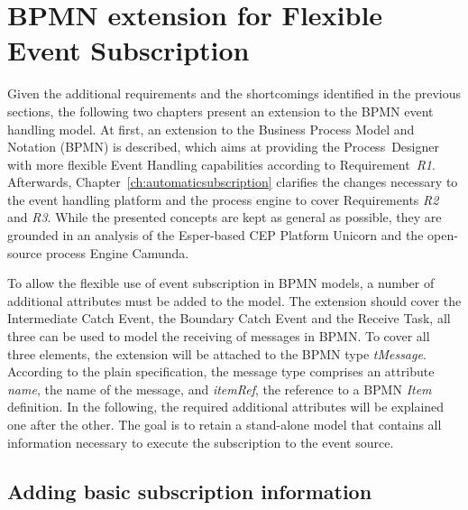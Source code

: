 \chapter{BPMN extension for Flexible Event Subscription}\label{ch:flexibleeventsubscription}


Given the additional requirements and the shortcomings identified in the previous sections, the following two chapters present an extension to the BPMN event handling model.
At first, an extension to the Business Process Model and Notation (BPMN) is described, which aims at providing the Process~Designer with more flexible Event Handling capabilities according to Requirement~\textit{R1}.
Afterwards, Chapter~\autoref{ch:automaticsubscription} clarifies the changes necessary to the event handling platform and the process engine to cover Requirements \textit{R2} and \textit{R3}.
While the presented concepts are kept as general as possible, they are grounded in an analysis of the Esper-based CEP Platform Unicorn and the open-source process Engine Camunda.

To allow the flexible use of event subscription in BPMN models, a number of additional attributes must be added to the model. 
The extension should cover the Intermediate Catch Event, the Boundary Catch Event and the Receive Task, all three can be used to model the receiving of messages in BPMN.
To cover all three elements, the extension will be attached to the BPMN type \textit{tMessage}. 
According to the plain specification, the message type comprises an attribute \textit{name}, the name of the message, and \textit{itemRef}, the reference to a BPMN \textit{Item} definition. 
In the following, the required additional attributes will be explained one after the other. The goal is to retain a stand-alone model that contains all information necessary to execute the subscription to the event source.

\section{Adding basic subscription information}\label{ch:bpmnx:basic}

